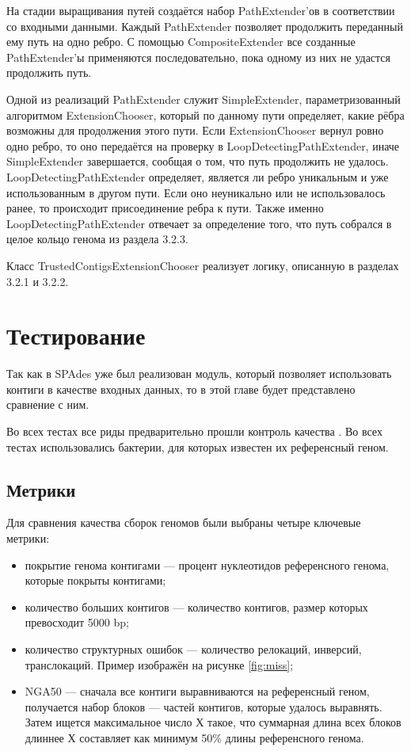 \documentclass[14pt]{matmex-diploma-custom}
\begin{document}
\begin{sloppypar}
На стадии выращивания путей создаётся набор PathExtender'ов в соответствии со входными данными. Каждый PathExtender позволяет продолжить переданный ему путь на одно ребро. С помощью CompositeExtender все созданные PathExtender'ы применяются последовательно, пока одному из них не удастся продолжить путь. 
\end{sloppypar}

\begin{sloppypar}
Одной из реализаций PathExtender служит SimpleExtender, параметризованный алгоритмом ExtensionChooser, который по данному пути определяет, какие рёбра возможны для продолжения этого пути. Если ExtensionChooser вернул ровно одно ребро, то оно передаётся на проверку в LoopDetectingPathExtender, иначе SimpleExtender завершается, сообщая о том, что путь продолжить не удалось. LoopDetectingPathExtender определяет, является ли ребро уникальным и уже использованным в другом пути. Если оно неуникально или не использовалось ранее, то происходит присоединение ребра к пути. Также именно LoopDetectingPathExtender отвечает за определение того, что путь собрался в целое кольцо генома из раздела 3.2.3.
\end{sloppypar}

Класс TrustedContigsExtensionChooser реализует логику, описанную в разделах 3.2.1 и 3.2.2.

\section{Тестирование}
Так как в SPAdes уже был реализован модуль, который позволяет использовать контиги в качестве входных данных, то в этой главе будет представлено сравнение с ним.

Во всех тестах все риды предварительно прошли контроль качества \cite{art:patel2012ngs}. Во всех тестах использовались бактерии, для которых известен их референсный геном.

\subsection{Метрики}
Для сравнения качества сборок геномов были выбраны четыре ключевые метрики:
\begin{itemize}
	\item покрытие генома контигами --- процент нуклеотидов референсного генома, которые покрыты контигами;
	\item количество больших контигов --- количество контигов, размер которых превосходит 5000 bp;
	\item количество структурных ошибок --- количество релокаций, инверсий, транслокаций. Пример изображён на рисунке \ref{fig:miss};
	\item NGA50 --- сначала все контиги выравниваются на референсный геном, получается набор блоков --- частей контигов, которые удалось выравнять. Затем ищется максимальное число Х такое, что суммарная длина всех блоков длиннее Х составляет как минимум 50\% длины референсного генома.
\end{itemize}
\end{document}
